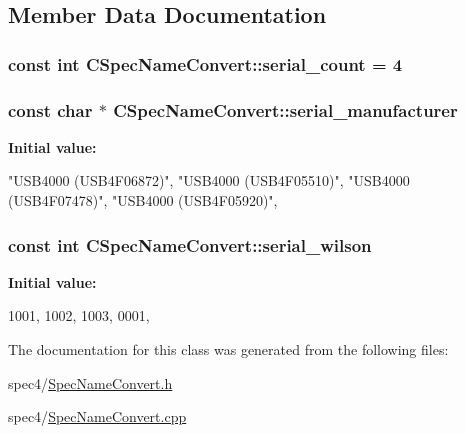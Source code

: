\subsection{Member Data Documentation}
\hypertarget{classCSpecNameConvert_a3824bd6a72d471ae882e39f746956480}{
\subsubsection[{serial\_\-count}]{\setlength{\rightskip}{0pt plus 5cm}const int {\bf CSpecNameConvert::serial\_\-count} = 4}}
\label{classCSpecNameConvert_a3824bd6a72d471ae882e39f746956480}
\hypertarget{classCSpecNameConvert_a436a72b60b45a1d1a6f7fbe51b776ede}{
\subsubsection[{serial\_\-manufacturer}]{\setlength{\rightskip}{0pt plus 5cm}const char $\ast$ {\bf CSpecNameConvert::serial\_\-manufacturer}}}
\label{classCSpecNameConvert_a436a72b60b45a1d1a6f7fbe51b776ede}
{\bfseries Initial value:}
\begin{DoxyCode}
 {
                "USB4000 (USB4F06872)",
                "USB4000 (USB4F05510)",
                "USB4000 (USB4F07478)",
                "USB4000 (USB4F05920)", 
        }
\end{DoxyCode}
\hypertarget{classCSpecNameConvert_a4625186edfb4c8c6f3978e39c1080b1c}{
\subsubsection[{serial\_\-wilson}]{\setlength{\rightskip}{0pt plus 5cm}const int {\bf CSpecNameConvert::serial\_\-wilson}}}
\label{classCSpecNameConvert_a4625186edfb4c8c6f3978e39c1080b1c}
{\bfseries Initial value:}
\begin{DoxyCode}
 {
                1001,
                1002,
                1003,
                0001,
        }
\end{DoxyCode}


The documentation for this class was generated from the following files:\begin{DoxyCompactItemize}
\item 
spec4/\hyperlink{SpecNameConvert_8h}{SpecNameConvert.h}\item 
spec4/\hyperlink{SpecNameConvert_8cpp}{SpecNameConvert.cpp}\end{DoxyCompactItemize}
